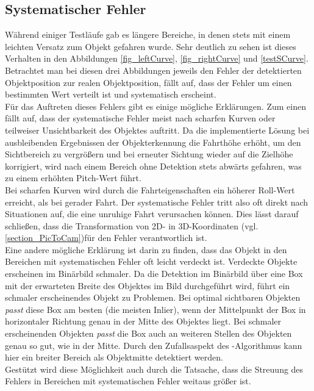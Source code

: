 \subsection{Systematischer Fehler}
\label{sec_sysError}
Während einiger Testläufe gab es längere Bereiche, in denen stets mit einem leichten Versatz zum Objekt gefahren wurde. Sehr deutlich zu sehen ist dieses Verhalten in den Abbildungen \ref{fig_leftCurve}, \ref{fig_rightCurve} und \ref{testSCurve}. Betrachtet man bei diesen drei Abbildungen jeweils den Fehler der detektierten Objektposition zur realen Objektposition, fällt auf, dass der Fehler um einen bestimmten Wert verteilt ist und systematisch erscheint.\\
Für das Auftreten dieses Fehlers gibt es einige mögliche Erklärungen.
Zum einen fällt auf, dass der systematische Fehler meist nach scharfen Kurven oder teilweiser Unsichtbarkeit des Objektes auftritt. Da die implementierte Lösung bei ausbleibenden Ergebnissen der Objekterkennung die Fahrthöhe erhöht, um den Sichtbereich zu vergrößern und bei erneuter Sichtung wieder auf die Zielhöhe korrigiert, wird nach einem Bereich ohne Detektion stets abwärts gefahren, was zu einem erhöhten Pitch-Wert führt.\\
Bei scharfen Kurven wird durch die Fahrteigenschaften ein höherer Roll-Wert erreicht, als bei gerader Fahrt.
Der systematische Fehler tritt also oft direkt nach Situationen auf, die eine unruhige Fahrt verursachen können. Dies lässt darauf schließen, dass die Transformation von 2D- in 3D-Koordinaten (vgl. \ref{section_PicToCam})für den Fehler verantwortlich ist.\\
Eine andere mögliche Erklärung ist darin zu finden, dass das Objekt in den Bereichen mit systematischen Fehler oft leicht verdeckt ist. Verdeckte Objekte erscheinen im Binärbild schmaler. Da die Detektion im Binärbild über eine Box mit der erwarteten Breite des Objektes im Bild durchgeführt wird, führt ein schmaler erscheinendes Objekt zu Problemen. Bei optimal sichtbaren Objekten \textit{passt} diese Box am besten (die meisten Inlier), wenn der Mittelpunkt der Box in horizontaler Richtung genau in der Mitte des Objektes liegt. Bei schmaler erscheinenden Objekten \textit{passt} die Box auch an weiteren Stellen des Objekten genau so gut, wie in der Mitte. Durch den Zufallsaspekt des \rans -Algorithmus kann hier ein breiter Bereich als Objektmitte detektiert werden.\\
Gestützt wird diese Möglichkeit auch durch die Tatsache, dass die Streuung des Fehlers in Bereichen mit systematischen Fehler weitaus größer ist.
